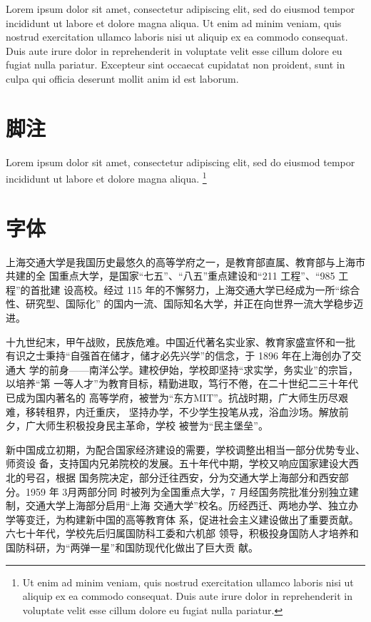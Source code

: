 \documentclass{sjtureport}
\begin{document}
Lorem ipsum dolor sit amet, consectetur adipiscing elit, sed do eiusmod tempor
incididunt ut labore et dolore magna aliqua. Ut enim ad minim veniam, quis
nostrud exercitation ullamco laboris nisi ut aliquip ex ea commodo consequat.
Duis aute irure dolor in reprehenderit in voluptate velit esse cillum dolore eu
fugiat nulla pariatur. Excepteur sint occaecat cupidatat non proident, sunt in
culpa qui officia deserunt mollit anim id est laborum.

\section{脚注}

Lorem ipsum dolor sit amet, consectetur adipiscing elit, sed do eiusmod tempor
incididunt ut labore et dolore magna aliqua. \footnote{Ut enim ad minim veniam,
quis nostrud exercitation ullamco laboris nisi ut aliquip ex ea commodo
consequat. Duis aute irure dolor in reprehenderit in voluptate velit esse cillum
dolore eu fugiat nulla pariatur.}

\section{字体}


上海交通大学是我国历史最悠久的高等学府之一，是教育部直属、教育部与上海市共建的全
国重点大学，是国家“七五”、“八五”重点建设和“211 工程”、“985 工程”的首批建
设高校。经过 115 年的不懈努力，上海交通大学已经成为一所“综合性、研究型、国际化”
的国内一流、国际知名大学，并正在向世界一流大学稳步迈进。

{\songti 十九世纪末，甲午战败，民族危难。中国近代著名实业家、教育家盛宣怀和一批
有识之士秉持“自强首在储才，储才必先兴学”的信念，于 1896 年在上海创办了交通大
学的前身——南洋公学。建校伊始，学校即坚持“求实学，务实业”的宗旨，以培养“第
一等人才”为教育目标，精勤进取，笃行不倦，在二十世纪二三十年代已成为国内著名的
高等学府，被誉为“东方MIT”。抗战时期，广大师生历尽艰难，移转租界，内迁重庆，
坚持办学，不少学生投笔从戎，浴血沙场。解放前夕，广大师生积极投身民主革命，学校
被誉为“民主堡垒”。

新中国成立初期，为配合国家经济建设的需要，学校调整出相当一部分优势专业、师资设
备，支持国内兄弟院校的发展。五十年代中期，学校又响应国家建设大西北的号召，根据
国务院决定，部分迁往西安，分为交通大学上海部分和西安部分。1959 年 3月两部分同
时被列为全国重点大学，7 月经国务院批准分别独立建制，交通大学上海部分启用“上海
交通大学”校名。历经西迁、两地办学、独立办学等变迁，为构建新中国的高等教育体
系，促进社会主义建设做出了重要贡献。六七十年代，学校先后归属国防科工委和六机部
领导，积极投身国防人才培养和国防科研，为“两弹一星”和国防现代化做出了巨大贡
献。}
\end{document}
